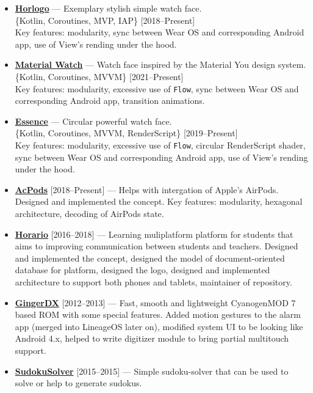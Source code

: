 \documentclass[a4paper]{article}
\begin{document}
\begin{itemize}
		\item \faAndroid \enskip \href{https://github.com/AChep/horlogo}{\textbf{Horlogo}} --- Exemplary stylish simple watch face. \\[0.2em]
		{\footnotesize \{Kotlin, Coroutines, MVP, IAP\} \hfill [2018--Present]} \\[0.2em]
		Key features: modularity, sync between Wear OS and corresponding Android app, use of View's rending under the hood.   
			
		\item \faAndroid \enskip \href{https://github.com/AChep/materialwatch}{\textbf{Material Watch}} --- Watch face inspired by the Material You design system. \\[0.2em]
		{\footnotesize \{Kotlin, Coroutines, MVVM\} \hfill [2021--Present]} \\[0.2em]
		Key features: modularity, excessive use of \texttt{Flow}, sync between Wear OS and corresponding Android app, transition animations.   
		
		\item \faAndroid \enskip \href{https://github.com/AChep/essence}{\textbf{Essence}} --- Circular powerful watch face. \\[0.2em]
		{\footnotesize \{Kotlin, Coroutines, MVVM, RenderScript\} \hfill [2019--Present]} \\[0.2em]
		Key features: modularity, excessive use of \texttt{Flow}, circular RenderScript shader, sync between Wear OS and corresponding Android app, use of View's rending under the hood.  
		
		\item {\footnotesize \faAndroid \enskip \href{https://github.com/AChep/acpods}{\textbf{AcPods}} [2018--Present] --- Helps with intergation of Apple's AirPods. Designed and implemented the concept. Key features: modularity, hexagonal architecture, decoding of AirPods state.}   
		
		\item {\footnotesize \faAndroid \enskip \href{http://artemchep.com/horario/}{\textbf{Horario}} [2016--2018] --- Learning muliplatform platform for students that aims to improving communication between students and teachers. Designed and implemented the concept, designed the model of document-oriented database for platform, designed the logo, designed and implemented architecture to support both phones and tablets, maintainer of repository.} 
		
		\item {\footnotesize \faAndroid \enskip \href{https://forum.xda-developers.com/showthread.php?t=1188486}{\textbf{GingerDX}} [2012--2013] --- Fast, smooth and lightweight CyanogenMOD 7 based ROM with some special features. Added motion gestures to the alarm app (merged into LineageOS later on), modified system UI to be looking like Android 4.x, helped to write digitizer module to bring partial multitouch support.}
		
		\item {\footnotesize \href{https://github.com/AChep/SudokuSolver}{\textbf{SudokuSolver}} [2015--2015] --- Simple sudoku-solver that can be used to solve or help to generate sudokus.}
	\end{itemize}
	
\end{document}
